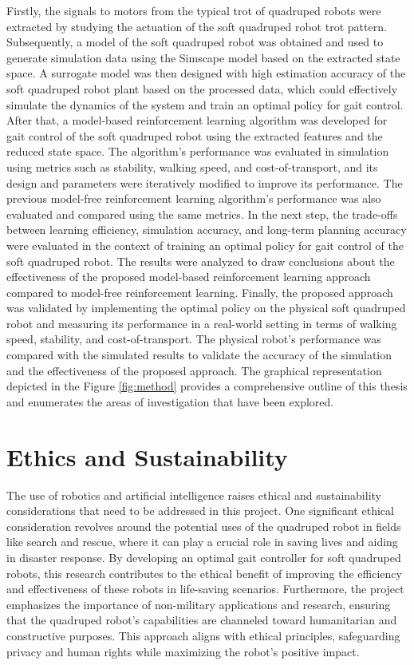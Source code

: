 Firstly, the signals to motors from the typical trot of quadruped robots were extracted by studying the actuation of the soft quadruped robot trot pattern. Subsequently, a model of the soft quadruped robot was obtained and used to generate simulation data using the Simscape model based on the extracted state space. A surrogate model was then designed with high estimation accuracy of the soft quadruped robot plant based on the processed data, which could effectively simulate the dynamics of the system and train an optimal policy for gait control. After that, a model-based reinforcement learning algorithm was developed for gait control of the soft quadruped robot using the extracted features and the reduced state space. The algorithm's performance was evaluated in simulation using metrics such as stability, walking speed, and cost-of-transport, and its design and parameters were iteratively modified to improve its performance. The previous model-free reinforcement learning algorithm's performance was also evaluated and compared using the same metrics. In the next step, the trade-offs between learning efficiency, simulation accuracy, and long-term planning accuracy were evaluated in the context of training an optimal policy for gait control of the soft quadruped robot. The results were analyzed to draw conclusions about the effectiveness of the proposed model-based reinforcement learning approach compared to model-free reinforcement learning. Finally, the proposed approach was validated by implementing the optimal policy on the physical soft quadruped robot and measuring its performance in a real-world setting in terms of walking speed, stability, and cost-of-transport. The physical robot's performance was compared with the simulated results to validate the accuracy of the simulation and the effectiveness of the proposed approach. The graphical representation depicted in the Figure \ref{fig:method} provides a comprehensive outline of this thesis and enumerates the areas of investigation that have been explored.

 
\section{Ethics and Sustainability}
The use of robotics and artificial intelligence raises ethical and sustainability considerations that need to be addressed in this project. One significant ethical consideration revolves around the potential uses of the quadruped robot in fields like search and rescue, where it can play a crucial role in saving lives and aiding in disaster response. By developing an optimal gait controller for soft quadruped robots, this research contributes to the ethical benefit of improving the efficiency and effectiveness of these robots in life-saving scenarios. Furthermore, the project emphasizes the importance of non-military applications and research, ensuring that the quadruped robot's capabilities are channeled toward humanitarian and constructive purposes. This approach aligns with ethical principles, safeguarding privacy and human rights while maximizing the robot's positive impact. 

